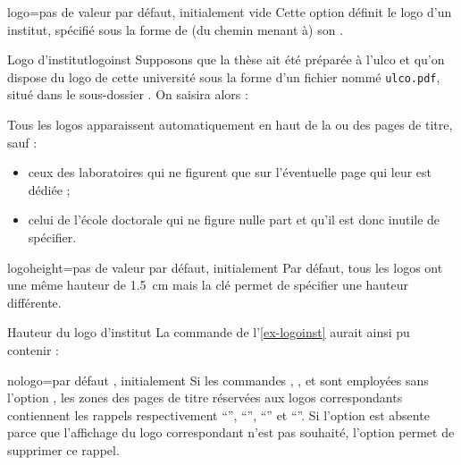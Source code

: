 \begin{docKey}{logo}{=}{pas de valeur
    par défaut, initialement vide}
  Cette option définit le logo d'un institut, spécifié sous la forme de (du
  chemin menant à) son .
  \begin{dbexample}{Logo d'institut}{logoinst}
    Supposons que la thèse ait été préparée à l'\gls{ulco} et qu'on dispose du
    logo de cette université sous la forme d'un fichier nommé
    \texttt{ulco.pdf}, situé dans le sous-dossier . On
    saisira alors :
\begin{preamblecode}[listing options={deletekeywords={[5]institute}}]
\end{preamblecode}
\end{dbexample}
Tous les logos apparaissent automatiquement en haut de la ou des
pages de titre, sauf :
\begin{itemize}
\item ceux des laboratoires qui ne figurent que sur l'éventuelle page qui leur
  est dédiée ;
\item celui de l'école doctorale qui ne figure nulle part et qu'il est donc
  inutile de spécifier.
\end{itemize}
\end{docKey}
%
\begin{docKey}{logoheight}{=}{pas de valeur par
    défaut, initialement \docValue*{1.5cm}}
  Par défaut, tous les logos ont une même hauteur de \SI{1.5}{\cm}
  mais la clé  permet de spécifier une hauteur
  différente.
  \begin{dbexample}{Hauteur du logo d'institut}{}
    La commande de l'\vref{ex-logoinst} aurait ainsi pu contenir :
\begin{preamblecode}[listing options={deletekeywords={[5]institute}}]
\end{preamblecode}
\end{dbexample}
\end{docKey}
%
\begin{docKey}[][doc new=2019-03-28]{nologo}{=\textbar{}}{par défaut
    , initialement }%
  Si les commandes , ,  et
   sont employées sans l'option , les zones des
  pages de titre réservées aux logos correspondants contiennent les rappels
  respectivement \enquote{}, \enquote{}, \enquote{} et
  \enquote{}. Si l'option  est absente
  parce que l'affichage du logo correspondant n'est pas souhaité, l'option
   permet de supprimer ce rappel.
\end{docKey}
